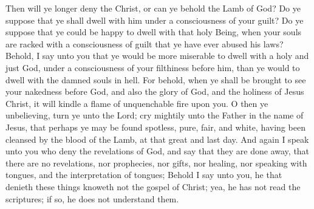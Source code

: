 Then will ye longer deny the Christ, or can ye behold the Lamb of God? Do ye suppose that ye shall dwell with him under a consciousness of your guilt? Do ye suppose that ye could be happy to dwell with that holy Being, when your souls are racked with a consciousness of guilt that ye have ever abused his laws?
\bverse \iffalse Behold, I say unto you that ye would be more miserable to dwell with a holy and just God, under a consciousness of your filthiness before him, than ye would to dwell with the damned souls in hell. \fi
Behold, I say unto you that ye would be more miserable to dwell with a holy and just God, under a consciousness of your filthiness before him, than ye would to dwell with the damned souls in hell.
\bverse \iffalse For behold, when ye shall be brought to see your nakedness before God, and also the glory of God, and the holiness of Jesus Christ, it will kindle a flame of unquenchable fire upon you. \fi
For behold, when ye shall be brought to see your nakedness before God, and also the glory of God, and the holiness of Jesus Christ, it will kindle a flame of unquenchable fire upon you.
\bverse \iffalse O then ye unbelieving, turn ye unto the Lord; cry mightily unto the Father in the name of Jesus, that perhaps ye may be found spotless, pure, fair, and white, having been cleansed by the blood of the Lamb, at that great and last day. \fi
O then ye unbelieving, turn ye unto the Lord; cry mightily unto the Father in the name of Jesus, that perhaps ye may be found spotless, pure, fair, and white, having been cleansed by the blood of the Lamb, at that great and last day.
\bverse \iffalse And again I speak unto you who deny the revelations of God, and say that they are done away, that there are no revelations, nor prophecies, nor gifts, nor healing, nor speaking with tongues, and the interpretation of tongues; \fi
And again I speak unto you who deny the revelations of God, and say that they are done away, that there are no revelations, nor prophecies, nor gifts, nor healing, nor speaking with tongues, and the interpretation of tongues;
\bverse \iffalse Behold I say unto you, he that denieth these things knoweth not the gospel of Christ; yea, he has not read the scriptures; if so, he does not understand them. \fi
Behold I say unto you, he that denieth these things knoweth not the gospel of Christ; yea, he has not read the scriptures; if so, he does not understand them.
\bverse \iffalse For do we not read that God is the same yesterday, today, and forever, and in him there is no variableness neither shadow of changing? \fi

